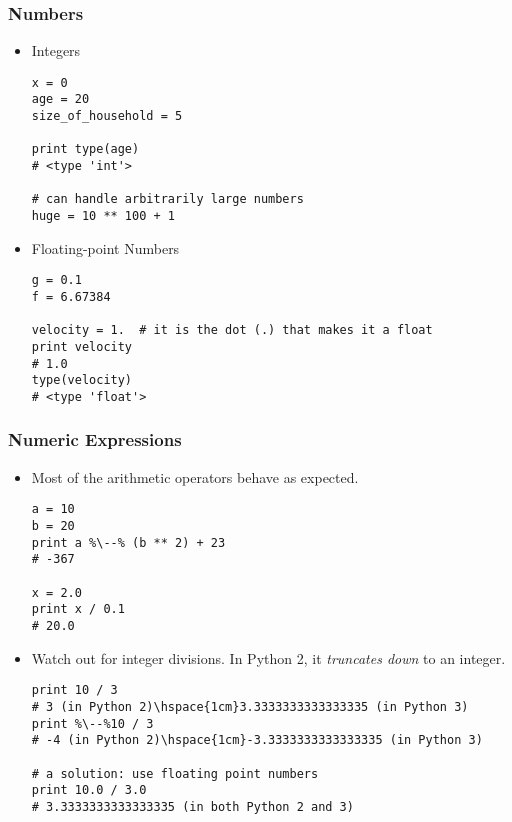\documentclass{beamer}
\begin{document}
\begin{frame}[fragile]
\frametitle{Numbers}
\begin{itemize}
\item Integers
\begin{lstlisting}
x = 0
age = 20 
size_of_household = 5

print type(age)
# <type 'int'>

# can handle arbitrarily large numbers
huge = 10 ** 100 + 1
\end{lstlisting} 

\item Floating-point Numbers
\begin{lstlisting}
g = 0.1
f = 6.67384

velocity = 1.  # it is the dot (.) that makes it a float
print velocity
# 1.0
type(velocity)
# <type 'float'>
\end{lstlisting}
\end{itemize}
\end{frame}

\begin{frame}[fragile]
\frametitle{Numeric Expressions}
\begin{itemize}
\item Most of the arithmetic operators behave as expected.
\begin{lstlisting}[escapechar=\%]
a = 10
b = 20
print a %\--% (b ** 2) + 23 
# -367

x = 2.0
print x / 0.1
# 20.0
\end{lstlisting}
\item Watch out for integer divisions. In Python 2, it
      \emph{truncates down} to an integer.
\begin{lstlisting}[escapechar=\%]
print 10 / 3
# 3 (in Python 2)\hspace{1cm}3.3333333333333335 (in Python 3)
print %\--%10 / 3
# -4 (in Python 2)\hspace{1cm}-3.3333333333333335 (in Python 3)

# a solution: use floating point numbers
print 10.0 / 3.0
# 3.3333333333333335 (in both Python 2 and 3)   
\end{lstlisting}
\end{itemize}
\end{frame}
\end{document}
